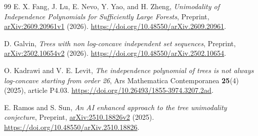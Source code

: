 \documentclass[UTF8,11pt,a4paper,fontset=fandol]{ctexart}
\theoremstyle{remark}
\numberwithin{equation}{section}
\begin{document}
\begin{thebibliography}{99}
E. X. Fang, J. Lu, E. Nevo, Y. Yao, and H. Zheng,
\emph{Unimodality of Independence Polynomials for Sufficiently Large Forests},
Preprint, \href{https://arxiv.org/abs/2609.20961v1}{arXiv:2609.20961v1} (2026).
\url{https://doi.org/10.48550/arXiv.2609.20961}.

D. Galvin,
\emph{Trees with non log-concave independent set sequences},
Preprint, \href{https://arxiv.org/abs/2502.10654v2}{arXiv:2502.10654v2} (2026).
\url{https://doi.org/10.48550/arXiv.2502.10654}.

O. Kadrawi and V. E. Levit,
\emph{The independence polynomial of trees is not always log-concave
starting from order 26}, Ars Mathematica Contemporanea \textbf{25}(4)
(2025), article P4.03.
\url{https://doi.org/10.26493/1855-3974.3207.2ad}.

E. Ramos and S. Sun,
\emph{An AI enhanced approach to the tree unimodality conjecture},
Preprint, \href{https://arxiv.org/abs/2510.18826v2}{arXiv:2510.18826v2} (2025).
\url{https://doi.org/10.48550/arXiv.2510.18826}.

\end{thebibliography}
\end{document}
